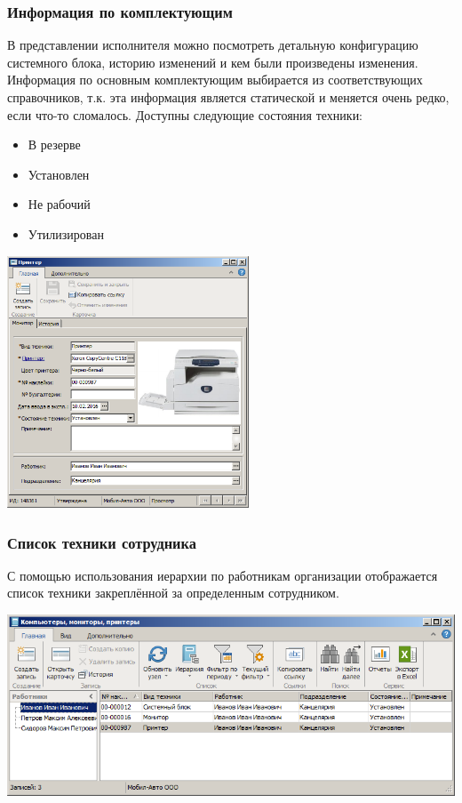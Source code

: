\documentclass{../industrial-development}
\begin{document}
\begin{frame} \frametitle{Информация по комплектующим}
В представлении исполнителя можно посмотреть детальную конфигурацию системного блока, историю изменений и кем были произведены изменения. Информация по основным комплектующим выбирается из соответствующих справочников, т.к. эта информация является статической и меняется очень редко, если что-то сломалось. 
\newline
	Доступны следующие состояния техники:
	\begin{itemize}
		\item В резерве
		\item Установлен
		\item Не рабочий
		\item Утилизирован
	\end{itemize}
	
\end{frame}
\lecturenotes

\begin{frame}
\centerline{\includegraphics[height=7.5cm]{pic7.png}}
\end{frame}
\lecturenotes

\begin{frame} \frametitle{Список техники сотрудника}
С помощью использования иерархии по работникам организации отображается список техники закреплённой за определенным сотрудником.
\centerline{\includegraphics[width=\textwidth]{pic9.png}}
\end{frame}
\lecturenotes
\end{document}
